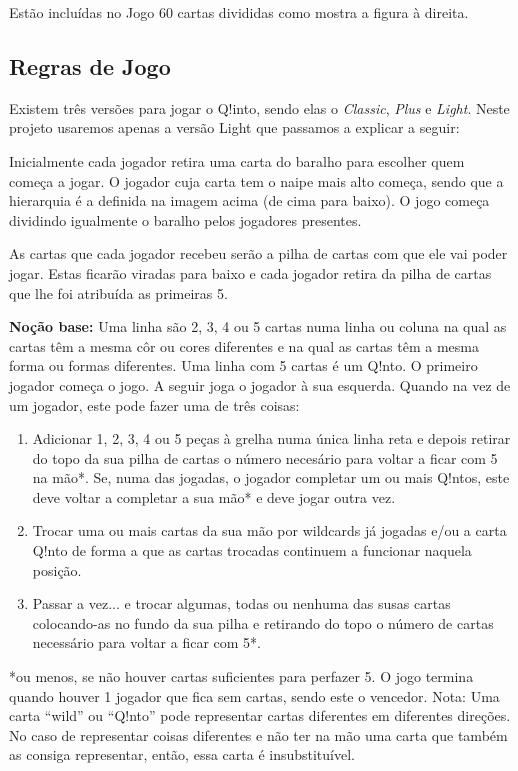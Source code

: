 \documentclass[a4paper]{article}
\begin{document}
Estão incluídas no Jogo 60 cartas divididas como mostra a figura à direita.

\subsection{Regras de Jogo}

Existem três versões para jogar o Q!into, sendo elas o
\textit{Classic},
\textit{Plus} e
\textit{Light}. Neste projeto usaremos apenas a versão Light que passamos a explicar a seguir:

Inicialmente cada jogador retira uma carta do baralho para escolher quem começa a jogar. O jogador cuja carta tem o naipe mais alto começa, sendo que a hierarquia é a definida na imagem acima (de cima para baixo). O jogo começa dividindo igualmente o baralho pelos jogadores presentes.

As cartas que cada jogador recebeu serão a pilha de cartas com que ele vai poder jogar. Estas ficarão viradas para baixo e cada jogador retira da pilha de cartas que lhe foi atribuída as primeiras 5. 

\textbf{Noção base:} Uma linha são 2, 3, 4 ou 5 cartas numa linha ou coluna na qual as cartas têm a mesma côr ou cores diferentes e na qual as cartas têm a mesma forma ou formas diferentes. Uma linha com 5 cartas é um Q!nto.
O primeiro jogador começa o jogo. A seguir joga o jogador à sua esquerda. Quando na vez de um jogador, este pode fazer uma de três coisas:

\begin{enumerate}
\item 		Adicionar 1, 2, 3, 4 ou 5 peças à grelha numa única linha reta e depois retirar do topo da sua pilha de cartas o número necesário para voltar a ficar com 5 na mão*.
Se, numa das jogadas, o jogador completar um ou mais Q!ntos, este deve voltar a completar a sua mão* e deve jogar outra vez.
\item		Trocar uma ou mais cartas da sua mão por wildcards já jogadas e/ou a carta Q!nto de forma a que as cartas trocadas continuem a funcionar naquela posição.
\item		Passar a vez... e trocar algumas, todas ou nenhuma das susas cartas colocando-as no fundo da sua pilha e retirando do topo o número de cartas necessário para voltar a ficar com 5*.
\end{enumerate}

*ou menos, se não houver cartas suficientes para perfazer 5.
O jogo termina quando houver 1 jogador que fica sem cartas, sendo este o vencedor.
Nota: Uma carta “wild” ou “Q!nto” pode representar cartas diferentes em diferentes direções. No caso de representar coisas diferentes e não ter na mão uma carta que também as consiga representar, então, essa carta é insubstituível.
\end{document}
